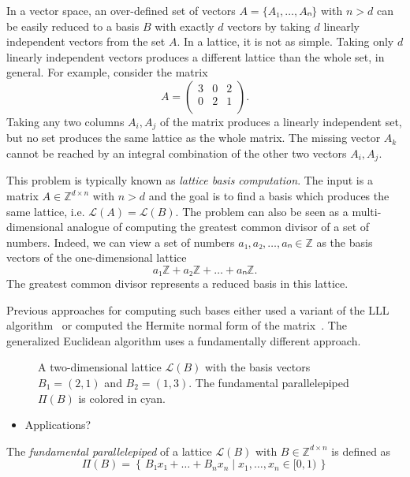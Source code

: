 In a vector space, an over-defined set of vectors $A = \{A₁, …, Aₙ\}$ with $n > d$
can be easily reduced to a basis $B$ with exactly $d$ vectors by taking $d$
linearly independent vectors from the set $A$.
In a lattice, it is not as simple.
Taking only $d$ linearly independent vectors produces a different lattice than
the whole set, in general.
For example, consider the matrix
\[
  A = \begin{pmatrix}
    3 & 0 & 2 \\
    0 & 2 & 1 \\
  \end{pmatrix}.
\]
Taking any two columns $A_i, A_j$ of the matrix produces a linearly independent
set, but no set produces the same lattice as the whole matrix.
The missing vector $A_k$ cannot be reached by an integral combination of the
other two vectors $A_i, A_j$.

This problem is typically known as \emph{lattice basis computation}.
The input is a matrix $A ∈ ℤ^{d×n}$ with $n > d$ and the goal is to find a
basis which produces the same lattice, i.e. $\mathcal L(A) = \mathcal L(B)$.
The problem can also be seen as a multi-dimensional analogue of
computing the greatest common divisor of a set of numbers.
Indeed, we can view a set of numbers $a₁, a₂, …, aₙ ∈ ℤ$ as the basis vectors
of the one-dimensional lattice
\[
  a₁ℤ + a₂ ℤ + \dots + aₙ ℤ.
\]
The greatest common divisor represents a reduced basis in this lattice.

Previous approaches for computing such bases either used a variant of the LLL
algorithm~\cite{Lenstra82} or computed the Hermite normal form of the
matrix~\cite{Storjohann96}.
The generalized Euclidean algorithm uses a fundamentally different approach.

\begin{figure}[tbp]
  \centering
  
  \caption{
    A two-dimensional lattice $\mathcal L(B)$ with the basis vectors $B_1 = (2,
    1)$ and $B_2 = (1, 3)$. The fundamental parallelepiped $Π(B)$ is colored in
    {\color{cyan}cyan}.
  }
\end{figure}

\begin{itemize}
  \item Applications? \cite{Ajtai96,Gentry08}
\end{itemize}

\begin{definition}
  The \emph{fundamental parallelepiped} of a lattice $\mathcal{L}(B)$ with $B ∈ ℤ^{d × n}$ is defined as
  \[
    Π(B) = \left\{\, B₁ x₁ + \dots + B_n x_n \mid x_1, \dots, x_n ∈ [0, 1) \,\right\}
  \]
\end{definition}

